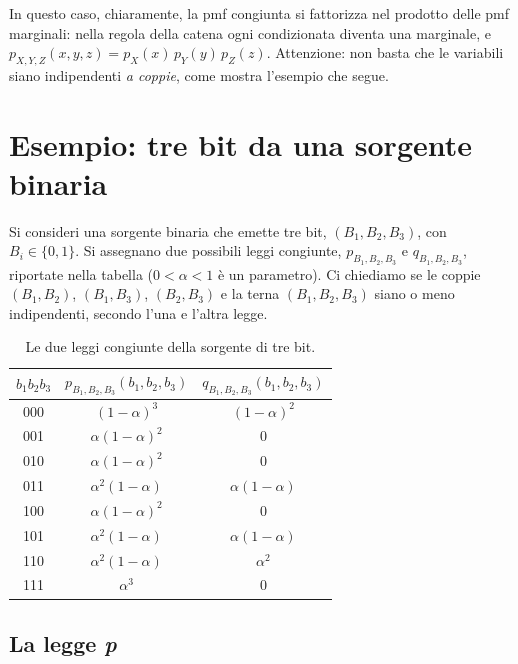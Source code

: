 In questo caso, chiaramente, la pmf congiunta si fattorizza nel prodotto delle pmf marginali: nella regola della
catena ogni condizionata diventa una marginale, e $p_{X,Y,Z}(x, y, z) = p_X(x)\, p_Y(y)\, p_Z(z)$. Attenzione: non
basta che le variabili siano indipendenti \emph{a coppie}, come mostra l'esempio che segue.

\section{Esempio: tre bit da una sorgente binaria}

Si consideri una sorgente binaria che emette tre bit, $(B_1, B_2, B_3)$, con $B_i \in \{0, 1\}$. Si assegnano due
possibili leggi congiunte, $p_{B_1,B_2,B_3}$ e $q_{B_1,B_2,B_3}$, riportate nella tabella ($0 < \alpha < 1$ è un
parametro). Ci chiediamo se le coppie $(B_1, B_2)$, $(B_1, B_3)$, $(B_2, B_3)$ e la terna $(B_1, B_2, B_3)$ siano o
meno indipendenti, secondo l'una e l'altra legge.

\begin{table}[H]
\centering
\renewcommand{\arraystretch}{1.3}
\begin{tabular}{@{}ccc@{}}
  \toprule
  $b_1 b_2 b_3$ & $p_{B_1,B_2,B_3}(b_1, b_2, b_3)$ & $q_{B_1,B_2,B_3}(b_1, b_2, b_3)$ \\
  \midrule
  000 & $(1-\alpha)^3$ & $(1-\alpha)^2$ \\
  001 & $\alpha(1-\alpha)^2$ & 0 \\
  010 & $\alpha(1-\alpha)^2$ & 0 \\
  011 & $\alpha^2(1-\alpha)$ & $\alpha(1-\alpha)$ \\
  100 & $\alpha(1-\alpha)^2$ & 0 \\
  101 & $\alpha^2(1-\alpha)$ & $\alpha(1-\alpha)$ \\
  110 & $\alpha^2(1-\alpha)$ & $\alpha^2$ \\
  111 & $\alpha^3$ & 0 \\
  \bottomrule
\end{tabular}
\caption{Le due leggi congiunte della sorgente di tre bit.}
\end{table}

\subsection{La legge \emph{p}}

